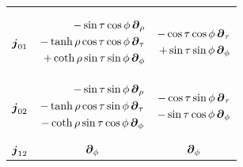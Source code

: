 \documentclass[a4paper,12pt]{article}
\begin{document}
\begin{table}[H]
\begin{adjustbox}{width=0.80\textwidth}
\begin{tabular}{ccc}
{\begin{equation*}
                     \end{equation*}} \\
                     $\boldsymbol{j}_{0 1}$ & \parbox{0.3\textwidth}{\begin{equation*}
                        \begin{split}
                           -\sin\tau \cos\phi \, \boldsymbol{\partial}_\rho \\ - \tanh\rho \cos\tau \cos\phi \, \boldsymbol{\partial}_\tau \\ + \coth\rho \sin\tau \sin\phi \, \boldsymbol{\partial}_\phi 
                        \end{split}
                     \end{equation*}} & \parbox{0.3\textwidth}{\begin{equation*}
                        \begin{split}
                           -\cos\tau \cos\phi \, \boldsymbol{\partial}_\tau \\ + \sin\tau \sin\phi \, \boldsymbol{\partial}_\phi 
                        \end{split}
                     \end{equation*}} \\
                     $\boldsymbol{j}_{0 2}$ & \parbox{0.3\textwidth}{\begin{equation*}
                        \begin{split}
                           -\sin\tau \sin\phi \, \boldsymbol{\partial}_\rho \\ - \tanh\rho \cos\tau \sin\phi \, \boldsymbol{\partial}_\tau \\ - \coth\rho \sin\tau \cos\phi \, \boldsymbol{\partial}_\phi 
                        \end{split}
                     \end{equation*}} & \parbox{0.3\textwidth}{\begin{equation*}
                        \begin{split}
                           -\cos\tau \sin\phi \, \boldsymbol{\partial}_\tau \\ - \sin\tau \cos\phi \, \boldsymbol{\partial}_\phi 
                        \end{split}
                     \end{equation*}} \\
                     $\boldsymbol{j}_{1 2}$ & $\boldsymbol{\partial}_\phi$ & $\boldsymbol{\partial}_\phi$ \\
                  \bottomrule
               \end{tabular}
            \end{adjustbox}
         \end{table}
\end{document}
